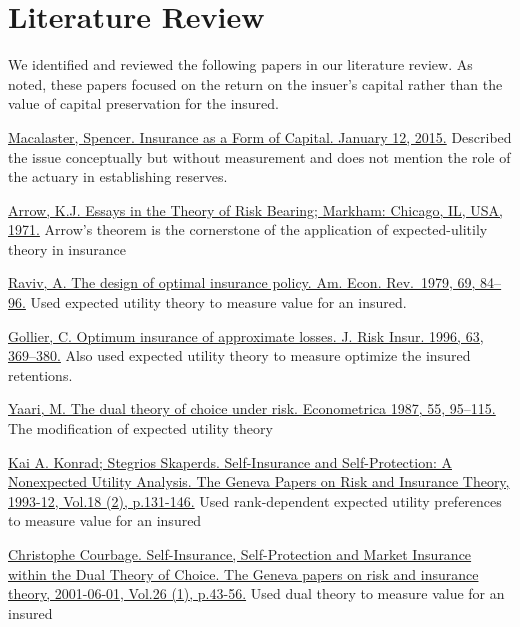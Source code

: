 \documentclass[
]{article}
\begin{document}
\newpage

\hypertarget{literature-review}{%
\section{Literature Review}\label{literature-review}}

We identified and reviewed the following papers in our literature
review. As noted, these papers focused on the return on the insuer's
capital rather than the value of capital preservation for the insured.

\href{https://www.insurancejournal.com/magazines/mag-closingquote/2015/01/12/353262.htm}{Macalaster,
Spencer. Insurance as a Form of Capital. January 12, 2015.} Described
the issue conceptually but without measurement and does not mention the
role of the actuary in establishing reserves.

\href{https://content.ebscohost.com/ContentServer.asp?T=P\&P=AN\&K=5054063\&S=R\&D=bth\&EbscoContent=dGJyMNXb4kSeqa440dvuOLCmsEieqK5Ss664TbOWxWXS\&ContentCustomer=dGJyMPGut1C0rLNRuePfgeyx83vt5OyF39\%2Fs}{Arrow,
K.J. Essays in the Theory of Risk Bearing; Markham: Chicago, IL, USA,
1971.} Arrow's theorem is the cornerstone of the application of
expected-ulitily theory in insurance

\href{https://www.jstor.org/stable/1802499}{Raviv, A. The design of
optimal insurance policy. Am. Econ. Rev.~1979, 69, 84--96.} Used
expected utility theory to measure value for an insured.

\href{https://www.jstor.org/stable/253617}{Gollier, C. Optimum insurance
of approximate losses. J. Risk Insur. 1996, 63, 369--380.} Also used
expected utility theory to measure optimize the insured retentions.

\href{https://www.jstor.org/stable/1911158}{Yaari, M. The dual theory of
choice under risk. Econometrica 1987, 55, 95--115.} The modification of
expected utility theory

\href{https://www.jstor.org/stable/41953283}{Kai A. Konrad; Stegrios
Skaperds. Self-Insurance and Self-Protection: A Nonexpected Utility
Analysis. The Geneva Papers on Risk and Insurance Theory, 1993-12,
Vol.18 (2), p.131-146.} Used rank-dependent expected utility preferences
to measure value for an insured

\href{https://www.researchgate.net/publication/5221351_Self-Insurance_Self-Protection_and_Market_Insurance_within_the_Dual_Theory_of_Choice_In_The_Geneva_Papers_on_Risk_and_Insurance_Theory_26_1_43-56}{Christophe
Courbage. Self-Insurance, Self-Protection and Market Insurance within
the Dual Theory of Choice. The Geneva papers on risk and insurance
theory, 2001-06-01, Vol.26 (1), p.43-56.} Used dual theory to measure
value for an insured
\end{document}
